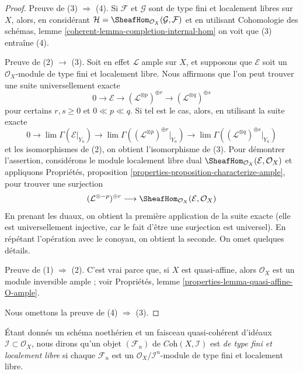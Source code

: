 \begin{proof}
Preuve de (3) $\Rightarrow$ (4). Si $\mathcal{F}$ et $\mathcal{G}$
sont de type fini et localement libres sur $X$, alors, en considérant
$\mathcal{H} = \SheafHom_{\mathcal{O}_X}(\mathcal{G}, \mathcal{F})$
et en utilisant Cohomologie des schémas, lemme
\ref{coherent-lemma-completion-internal-hom}
on voit que (3) entraîne (4).

\medskip\noindent
Preuve de (2) $\rightarrow$ (3). Soit en effet $\mathcal{L}$ ample
sur $X$, et supposons que $\mathcal{E}$ soit un
$\mathcal{O}_X$-module de type fini et localement libre.
Nous affirmons que l'on peut trouver une suite universellement exacte
$$
0 \to \mathcal{E} \to
(\mathcal{L}^{\otimes p})^{\oplus r} \to
(\mathcal{L}^{\otimes q})^{\oplus s}
$$
pour certains $r, s \geq 0$ et $0 \ll p \ll q$. Si tel est le cas, alors,
en utilisant la suite exacte
$$
0 \to \lim \Gamma(\mathcal{E}|_{Y_n}) \to
\lim \Gamma((\mathcal{L}^{\otimes p})^{\oplus r}|_{Y_n}) \to
\lim \Gamma((\mathcal{L}^{\otimes q})^{\oplus s}|_{Y_n})
$$
et les isomorphismes de (2), on obtient l'isomorphisme de (3).
Pour démontrer l'assertion, considérons le module localement libre dual
$\SheafHom_{\mathcal{O}_X}(\mathcal{E}, \mathcal{O}_X)$
et appliquons
Propriétés, proposition \ref{properties-proposition-characterize-ample},
pour trouver une surjection
$$
(\mathcal{L}^{\otimes -p})^{\oplus r}
\longrightarrow
\SheafHom_{\mathcal{O}_X}(\mathcal{E}, \mathcal{O}_X)
$$
En prenant les duaux, on obtient la première application de la suite exacte
(elle est universellement injective, car le fait d'être une surjection est universel).
En répétant l'opération avec le conoyau, on obtient la seconde. On omet quelques détails.

\medskip\noindent
Preuve de (1) $\Rightarrow$ (2). C'est vrai parce que, si $X$ est quasi-affine,
alors $\mathcal{O}_X$ est un module inversible ample ; voir
Propriétés, lemme \ref{properties-lemma-quasi-affine-O-ample}.

\medskip\noindent
Nous omettons la preuve de (4) $\Rightarrow$ (3).
\end{proof}

\noindent
Étant donnés un schéma noethérien et un faisceau quasi-cohérent d'idéaux
$\mathcal{I} \subset \mathcal{O}_X$, nous dirons
qu'un objet $(\mathcal{F}_n)$ de $\textit{Coh}(X, \mathcal{I})$
est {\it de type fini et localement libre} si chaque $\mathcal{F}_n$ est un
$\mathcal{O}_X/\mathcal{I}^n$-module de type fini et localement libre.

